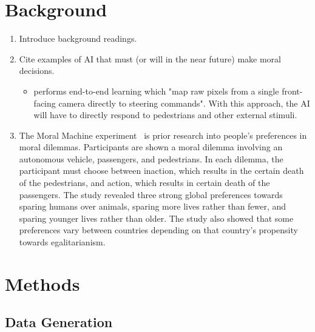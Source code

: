 \documentclass{report}
\begin{document}
\FloatBarrier
\chapter{Background}

\begin{enumerate}
    \item Introduce background readings.
    
    \item Cite examples of AI that must (or will in the near future) make moral decisions.
    \begin{itemize}
        \item \cite{bojarski2016end} performs end-to-end learning which "map raw pixels from a
        single front-facing camera directly to steering commands". With this approach, the AI will
        have to directly respond to pedestrians and other external stimuli.
    \end{itemize}
    
    \item The Moral Machine experiment~\cite{awad2018moral} is prior research into people's
    preferences in moral dilemmas. Participants are shown a moral dilemma involving an autonomous
    vehicle, passengers, and pedestrians. In each dilemma, the participant must choose between
    inaction, which results in the certain death of the pedestrians, and action, which results in
    certain death of the passengers. The study revealed three strong global preferences towards
    sparing humans over animals, sparing more lives rather than fewer, and sparing younger lives
    rather than older. The study also showed that some preferences vary between countries depending
    on that country's propensity towards egalitarianism.
\end{enumerate}

\FloatBarrier
\chapter{Methods}

\section{Data Generation}
\end{document}
